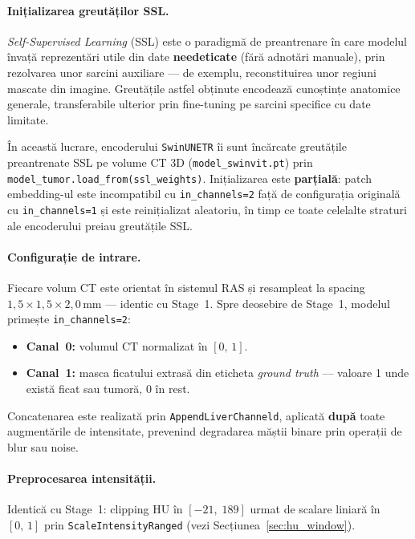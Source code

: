 \documentclass[12pt, a4paper]{report}
\begin{document}
\paragraph{Inițializarea greutăților SSL.}
\textit{Self-Supervised Learning} (SSL) este o paradigmă de
preantrenare în care modelul învață reprezentări utile din date
\textbf{needeticate} (fără adnotări manuale), prin rezolvarea unor
sarcini auxiliare — de exemplu, reconstituirea unor regiuni
mascate din imagine. Greutățile astfel obținute encodează
cunoștințe anatomice generale, transferabile ulterior prin
fine-tuning pe sarcini specifice cu date limitate.

În această lucrare, encoderului \texttt{SwinUNETR} îi sunt
încărcate greutățile preantrenate SSL pe volume CT 3D
(\texttt{model\_swinvit.pt}) prin
\texttt{model\_tumor.load\_from(ssl\_weights)}.
Inițializarea este \textbf{parțială}: patch embedding-ul este
incompatibil cu \texttt{in\_channels=2} față de configurația
originală cu \texttt{in\_channels=1} și este reinițializat
aleatoriu, în timp ce toate celelalte straturi ale encoderului
preiau greutățile SSL.


\paragraph{Configurație de intrare.}
Fiecare volum CT este orientat în sistemul RAS și resampleat la
spacing $1{,}5 \times 1{,}5 \times 2{,}0$\,mm — identic cu
Stage~1. Spre deosebire de Stage~1, modelul primește
\texttt{in\_channels=2}:

\begin{itemize}
    \item \textbf{Canal~0:} volumul CT normalizat în $[0,\,1]$.
    \item \textbf{Canal~1:} masca ficatului extrasă din eticheta
    \textit{ground truth} — valoare 1 unde există ficat sau tumoră,
    0 în rest.
\end{itemize}

Concatenarea este realizată prin \texttt{AppendLiverChanneld},
aplicată \textbf{după} toate augmentările de intensitate, prevenind
degradarea măștii binare prin operații de blur sau noise.

\paragraph{Preprocesarea intensității.}
Identică cu Stage~1: clipping HU în $[-21,\;189]$ urmat de scalare
liniară în $[0,\,1]$ prin \texttt{ScaleIntensityRanged}
(vezi Secțiunea~\ref{sec:hu_window}).
\end{document}
